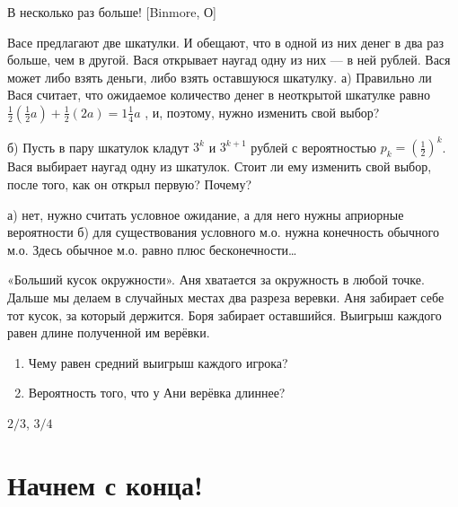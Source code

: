 \begin{problem}
 В несколько раз больше! [Binmore, О]\par
Васе предлагают две шкатулки. И обещают, что в одной из них денег в два раз больше, чем в другой. Вася открывает наугад одну из них — в ней  рублей. Вася может либо взять деньги, либо взять оставшуюся шкатулку.
а) Правильно ли Вася считает, что ожидаемое количество денег в неоткрытой шкатулке равно  $\frac{1}{2} \left(\frac{1}{2} a\right)+\frac{1}{2} \left(2a\right)=1\frac{1}{4} a$ , и, поэтому, нужно изменить свой выбор?\par
б) Пусть в пару шкатулок кладут  $3^{k} $  и  $3^{k+1} $  рублей с вероятностью  $p_{k} =\left(\frac{1}{2} \right)^{k} $. Вася выбирает наугад одну из шкатулок. Стоит ли ему изменить свой выбор, после того, как он открыл первую? Почему?\par



\begin{sol}
а) нет, нужно считать условное ожидание, а для него нужны априорные вероятности б) для существования условного м.о. нужна конечность обычного м.о. Здесь обычное м.о. равно плюс бесконечности\ldots
\end{sol}
\end{problem}



\begin{problem}
«Больший кусок окружности». Аня хватается за окружность в любой точке. Дальше мы делаем в случайных местах два разреза веревки. Аня забирает себе тот кусок, за который держится. Боря забирает оставшийся. Выигрыш каждого равен длине полученной им верёвки.
\begin{enumerate}
\item Чему равен средний выигрыш каждого игрока?
\item  Вероятность того, что у Ани верёвка длиннее?
\end{enumerate}




\begin{sol}
 $2/3$, $3/4$
\end{sol}
\end{problem}



\section{Начнем с конца!}


